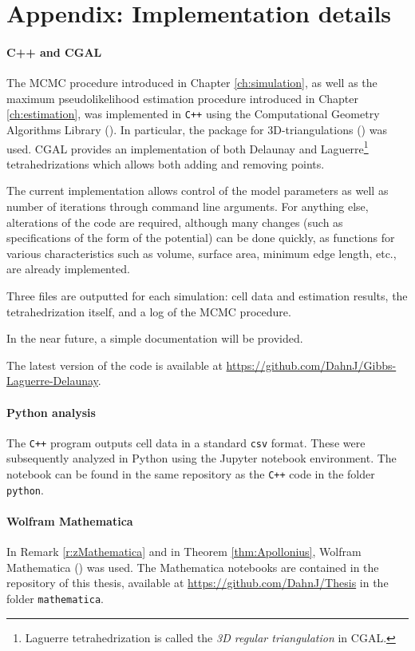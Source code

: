 \chapter{Appendix: Implementation details}\label{appendix:implementation}
\subsubsection{C++ and CGAL}
The MCMC procedure introduced in Chapter \ref{ch:simulation}, as well as the maximum pseudolikelihood estimation procedure introduced in Chapter \ref{ch:estimation}, was implemented in \texttt{C++} using the Computational Geometry Algorithms Library (\cite{cgal}). In particular, the package for 3D-triangulations (\cite{cgal:3d-triang}) was used. CGAL provides an implementation of both Delaunay and Laguerre\footnote{Laguerre tetrahedrization is called the \textit{3D regular triangulation} in CGAL.} tetrahedrizations which allows both adding and removing points.   

The current implementation allows control of the model parameters as well as number of iterations through command line arguments. For anything else, alterations of the code are required, although many changes (such as specifications of the form of the potential) can be done quickly, as functions for various characteristics such as volume, surface area, minimum edge length, etc., are already implemented. 

Three files are outputted for each simulation: cell data and estimation results, the tetrahedrization itself, and a log of the MCMC procedure.

In the near future, a simple documentation will be provided. 

The latest version of the code is available at \url{https://github.com/DahnJ/Gibbs-Laguerre-Delaunay}. 

\subsubsection{Python analysis}
The \texttt{C++} program outputs cell data in a standard \texttt{csv} format. These were subsequently analyzed in Python using the Jupyter notebook environment. The notebook can be found in the same repository as the \texttt{C++} code in the folder \texttt{python}. 


\subsubsection{Wolfram Mathematica}
In Remark \ref{r:zMathematica} and in Theorem \ref{thm:Apollonius}, Wolfram Mathematica (\cite{Mathematica}) was used. The Mathematica notebooks are contained in the repository of this thesis, available at \url{https://github.com/DahnJ/Thesis} in the folder \texttt{mathematica}.


